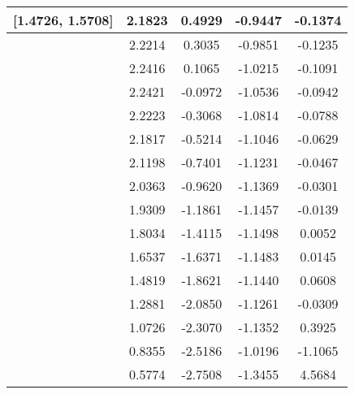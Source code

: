 \documentclass[a4paper, 14pt]{extarticle}
\begin{document}
\begin{table}[h!]
\begin{tabular}{|c|c|c|c|c|}
[1.4726, 1.5708] & 2.1823 & 0.4929 & -0.9447 & -0.1374 \\ \hline
[1.5708, 1.6690] & 2.2214 & 0.3035 & -0.9851 & -0.1235 \\ \hline
[1.6690, 1.7671] & 2.2416 & 0.1065 & -1.0215 & -0.1091 \\ \hline
[1.7671, 1.8653] & 2.2421 & -0.0972 & -1.0536 & -0.0942 \\ \hline
[1.8653, 1.9635] & 2.2223 & -0.3068 & -1.0814 & -0.0788 \\ \hline
[1.9635, 2.0617] & 2.1817 & -0.5214 & -1.1046 & -0.0629 \\ \hline
[2.0617, 2.1598] & 2.1198 & -0.7401 & -1.1231 & -0.0467 \\ \hline
[2.1598, 2.2580] & 2.0363 & -0.9620 & -1.1369 & -0.0301 \\ \hline
[2.2580, 2.3562] & 1.9309 & -1.1861 & -1.1457 & -0.0139 \\ \hline
[2.3562, 2.4544] & 1.8034 & -1.4115 & -1.1498 & 0.0052 \\ \hline
[2.4544, 2.5525] & 1.6537 & -1.6371 & -1.1483 & 0.0145 \\ \hline
[2.5525, 2.6507] & 1.4819 & -1.8621 & -1.1440 & 0.0608 \\ \hline
[2.6507, 2.7489] & 1.2881 & -2.0850 & -1.1261 & -0.0309 \\ \hline
[2.7489, 2.8471] & 1.0726 & -2.3070 & -1.1352 & 0.3925 \\ \hline
[2.8471, 2.9452] & 0.8355 & -2.5186 & -1.0196 & -1.1065 \\ \hline
[2.9452, 3.0434] & 0.5774 & -2.7508 & -1.3455 & 4.5684 \\ \hline
\end{tabular}
\end{table}
\end{document}

